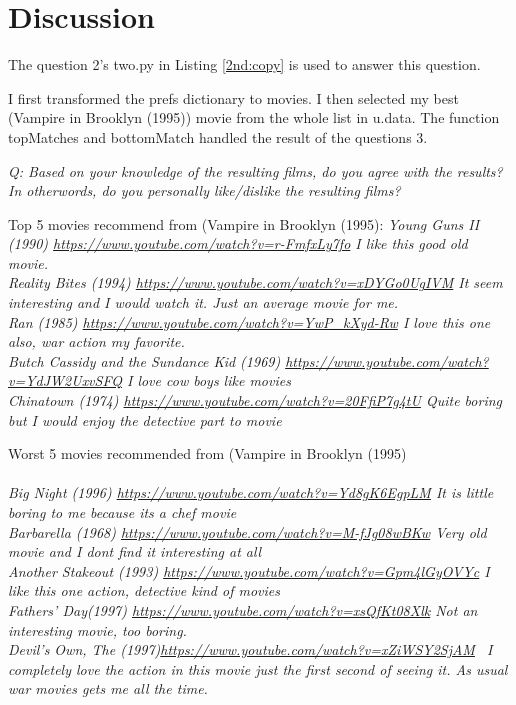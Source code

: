\documentclass[12pt]{article}
\begin{document}
\section*{Discussion}
The question 2's two.py in Listing \ref{2nd:copy} is used to answer this question.

I first transformed the prefs dictionary to movies. I then selected my best (Vampire in Brooklyn (1995)) movie from the whole list in u.data. The function topMatches and bottomMatch handled the result of the questions 3.

\emph{Q: Based on your knowledge of the resulting films, do you agree with the results?  In otherwords, do you personally like/dislike the resulting films?}

Top 5 movies recommend from (Vampire in Brooklyn (1995): \emph{Young Guns II (1990) \url{https://www.youtube.com/watch?v=r-FmfxLy7fo} I like this good old movie.\\ Reality Bites (1994)  \url{https://www.youtube.com/watch?v=xDYGo0UgIVM} It seem interesting and I would watch it. Just an average movie for me.\\ Ran (1985) \url{https://www.youtube.com/watch?v=YwP_kXyd-Rw} I love this one also, war action my favorite.  \\ Butch Cassidy and the Sundance Kid (1969) \url{https://www.youtube.com/watch?v=YdJW2UxvSFQ} I love cow boys like movies\\Chinatown (1974) \url{https://www.youtube.com/watch?v=20FfiP7g4tU} Quite boring but I would enjoy the detective part to movie }

Worst 5 movies recommended from (Vampire in Brooklyn (1995) \\ \\\emph{Big Night (1996) \url{https://www.youtube.com/watch?v=Yd8gK6EgpLM} It is little boring to me because its a chef movie\\ Barbarella (1968) \url{https://www.youtube.com/watch?v=M-fJg08wBKw} Very old movie and I dont find it interesting at all\\Another Stakeout (1993) \url{https://www.youtube.com/watch?v=Gpm4lGyOVYc} I like this one action, detective kind of movies\\Fathers’ Day(1997) \url{https://www.youtube.com/watch?v=xsQfKt08Xlk} Not an interesting movie, too boring.\\ Devil’s Own, The (1997)\url{https://www.youtube.com/watch?v=xZiWSY2SjAM} \ I completely love the action in this movie just the first second of seeing it. As usual war movies gets me all the time.}
\end{document}
